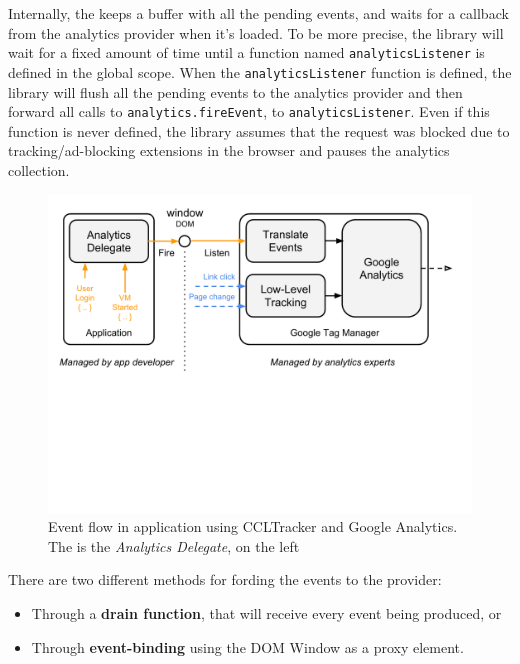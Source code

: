 Internally, the \CCLTrackerJS keeps a buffer with all the pending events, and waits for a callback from the analytics provider when it's loaded. To be more precise, the library will wait for a fixed amount of time until a function named \texttt{analyticsListener} is defined in the global scope. When the \texttt{analyticsListener} function is defined, the library will flush all the pending events to the analytics provider and then forward all calls to \texttt{analytics.fireEvent}, to \texttt{analyticsListener}. Even if this function is never defined, the library assumes that the request was blocked due to tracking/ad-blocking extensions in the browser and pauses the analytics collection. 

\begin{figure}[t]
  \begin{center}
		\includegraphics[width=\columnwidth]{imgs/CERN60Events.pdf}
  \end{center}
\caption{Event flow in application using CCLTracker and Google Analytics. The \CCLTrackerJS is the \emph{Analytics Delegate}, on the left}
\label{fig:cern60events}
\end{figure}

There are two different methods for fording the events to the provider: 
\begin{itemize}
\item Through a \textbf{drain function}, that will receive every event being produced, or
\item Through \textbf{event-binding} using the DOM Window as a proxy element.
\end{itemize}

